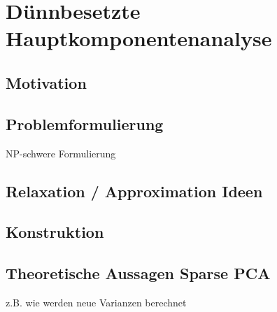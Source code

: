 \chapter{Dünnbesetzte Hauptkomponentenanalyse}

\label{sparse_pca}

\section{Motivation}

\section{Problemformulierung}
NP-schwere Formulierung

\section{Relaxation / Approximation Ideen}

\section{Konstruktion}

\section{Theoretische Aussagen Sparse PCA}
z.B. wie werden neue Varianzen berechnet